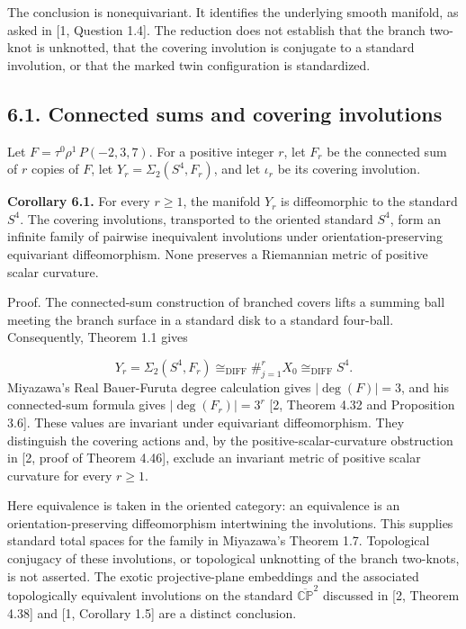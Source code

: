 \documentclass[11pt,letterpaper]{article}
\begin{document}
The conclusion is nonequivariant. It identifies the underlying smooth manifold, as asked in [1, Question 1.4]. The reduction does not establish that the branch two-knot is unknotted, that the covering involution is conjugate to a standard involution, or that the marked twin configuration is standardized.

\subsection*{6.1. Connected sums and covering involutions}
Let $F=\tau^0\rho^1\,P(-2,3,7)$. For a positive integer $r$, let $F_r$ be the connected sum of $r$ copies of $F$, let $Y_r=\Sigma_2(S^4,F_r)$, and let $\iota_r$ be its covering involution.

\medskip\noindent\textbf{Corollary 6.1.} For every $r\geq1$, the manifold $Y_r$ is diffeomorphic to the standard $S^4$. The covering involutions, transported to the oriented standard $S^4$, form an infinite family of pairwise inequivalent involutions under orientation-preserving equivariant diffeomorphism. None preserves a Riemannian metric of positive scalar curvature.

Proof. The connected-sum construction of branched covers lifts a summing ball meeting the branch surface in a standard disk to a standard four-ball. Consequently, Theorem 1.1 gives

\[
Y_r=\Sigma_2(S^4,F_r)\cong_{\mathrm{DIFF}}\#_{j=1}^{r}X_0\cong_{\mathrm{DIFF}}S^4.
\]
Miyazawa's Real Bauer-Furuta degree calculation gives $|\deg(F)|=3$, and his connected-sum formula gives $|\deg(F_r)|=3^r$ [2, Theorem 4.32 and Proposition 3.6]. These values are invariant under equivariant diffeomorphism. They distinguish the covering actions and, by the positive-scalar-curvature obstruction in [2, proof of Theorem 4.46], exclude an invariant metric of positive scalar curvature for every $r\geq1$.

Here equivalence is taken in the oriented category: an equivalence is an orientation-preserving diffeomorphism intertwining the involutions. This supplies standard total spaces for the family in Miyazawa's Theorem 1.7. Topological conjugacy of these involutions, or topological unknotting of the branch two-knots, is not asserted. The exotic projective-plane embeddings and the associated topologically equivalent involutions on the standard $\overline{\mathbb{CP}}^{2}$ discussed in [2, Theorem 4.38] and [1, Corollary 1.5] are a distinct conclusion.
\end{document}
